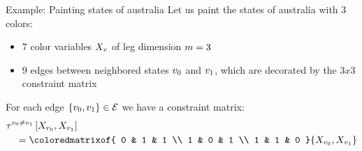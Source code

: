 \documentclass{beamer}
\begin{document}
    \begin{frame}{Example: Painting states of australia}
        Let us paint the states of australia with $3$ colors:
        \begin{itemize}
            \item $7$ color variables $X_{v}$ of leg dimension $m=3$
            \item $9$ edges between neighbored states $v_{0}$ and $v_{1}$, which are decorated by the $3x3$ constraint matrix
        \end{itemize}
        \begin{minipage}{0.54\textwidth}
            For each edge $\{v_{0},v_{1}\}\in \mathcal{E}$ we have a constraint matrix:
            \begin{align*}
                &\hypercoreofat{\nodeof{0}\neq\nodeof{1}}{\catvariableof{\nodeof{0}},\catvariableof{\nodeof{1}}} \\
                &\quad=
                \coloredmatrixof{
                    0 & 1 & 1 \\
                    1 & 0 & 1 \\
                    1 & 1 & 0
                }{\catvariableof{\nodeof{0}},\catvariableof{\nodeof{1}}}
            \end{align*}
        \end{minipage}
        \begin{minipage}{0.45\textwidth}
            
        \end{minipage}
    \end{frame}
\end{document}
